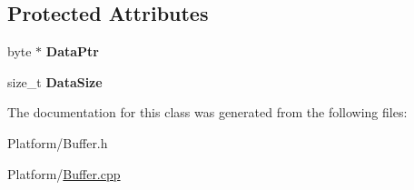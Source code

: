 \subsection*{Protected Attributes}
\begin{DoxyCompactItemize}
\item 
\mbox{\label{class_gost_crypt_1_1_buffer_ptr_a87d3420bcfd5f66d99ec89e037f338b9}} 
byte $\ast$ {\bfseries Data\+Ptr}
\item 
\mbox{\label{class_gost_crypt_1_1_buffer_ptr_a67b463f0cbcdc4246c88d927a1892e02}} 
size\+\_\+t {\bfseries Data\+Size}
\end{DoxyCompactItemize}


The documentation for this class was generated from the following files\+:\begin{DoxyCompactItemize}
\item 
Platform/Buffer.\+h\item 
Platform/\hyperlink{_buffer_8cpp}{Buffer.\+cpp}\end{DoxyCompactItemize}
